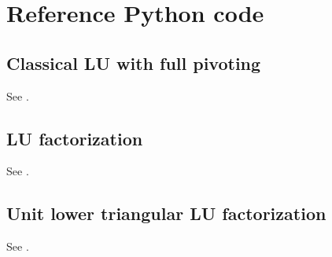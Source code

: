 \documentclass[10pt,twoside]{siamart1116}
\numberwithin{theorem}{section}
\begin{document}
\section{Reference Python code}

\subsection{Classical LU with full pivoting}\label{sec:python_full_pivoting}

See .



\subsection{LU factorization}\label{sec:python_restricted_pivoting}

See .



\subsection{Unit lower triangular LU factorization}\label{sec:python_unit_lower}

See .



\clearpage
{} %


\end{document}
